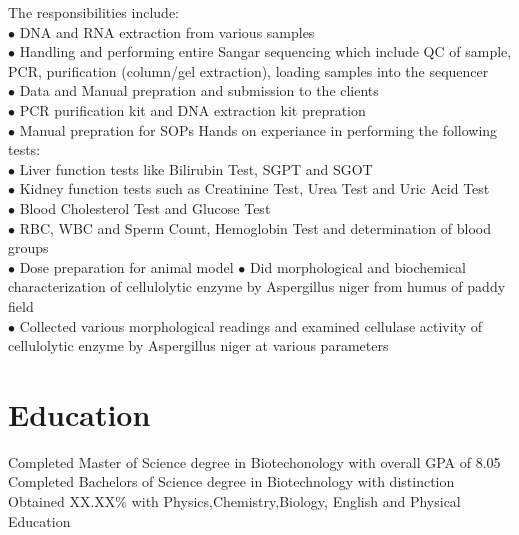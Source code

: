 \documentclass[letterpaper]{twentysecondcv} %
\begin{document}
\begin{twenty} %
	{The responsibilities include:\\
	$\bullet$ DNA and RNA extraction from various samples\\
	$\bullet$ Handling and performing entire Sangar sequencing which include QC of sample, PCR, purification (column/gel 			extraction), loading samples into the sequencer \\
	$\bullet$ Data and Manual prepration and submission to the clients\\
	$\bullet$ PCR purification kit and DNA extraction kit prepration\\
	$\bullet$ Manual prepration for SOPs
	}
	{Hands on experiance in performing the following tests:\\
	$\bullet$ Liver function tests like Bilirubin Test, SGPT and SGOT\\
	$\bullet$ Kidney function tests such as Creatinine Test, Urea Test and Uric Acid Test\\
	$\bullet$ Blood Cholesterol Test and Glucose Test\\
	$\bullet$ RBC, WBC and Sperm Count, Hemoglobin Test and determination of blood groups\\
	$\bullet$ Dose preparation for animal model
	}
	{$\bullet$ Did morphological and biochemical characterization of cellulolytic enzyme by Aspergillus niger from humus of 			paddy field\\
	$\bullet$ Collected various morphological readings and examined cellulase activity of cellulolytic enzyme by Aspergillus niger at various parameters\\
	}

\end{twenty}


\section{Education}

\begin{twenty} %
	{Completed Master of Science degree in Biotechonology with overall GPA of 8.05 }
	{Completed Bachelors of Science degree in Biotechnology with distinction}
	{Obtained XX.XX\% with Physics,Chemistry,Biology, English and Physical Education\\ }
\end{twenty}
\end{document}
